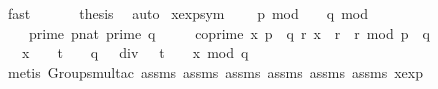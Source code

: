 \begin{isabellebody}
\ fast\ \isanewline
\ \ \isamarkupfalse%
\ \isamarkupfalse%
\ {\isachardoublequoteopen}{\isacharquery}{\kern0pt}thesis{\isachardoublequoteclose}\ \isamarkupfalse%
\ auto\isanewline
{}\isamarkupfalse%
%
\endisatagproof
{\isafoldproof}%
%
\isadelimproof
\isanewline
%
\endisadelimproof
\isanewline
\isanewline
{}\isamarkupfalse%
\ x{\isacharunderscore}{\kern0pt}exp{\isacharunderscore}{\kern0pt}sym{\isacharcolon}{\kern0pt}\ \isanewline
\ \ \ {\isachardoublequoteopen}p\ mod\ {}\ {\isacharequal}{\kern0pt}\ {}{\isachardoublequoteclose}\ {\isachardoublequoteopen}q\ mod\ {}\ {\isacharequal}{\kern0pt}\ {}{\isachardoublequoteclose}\ \isanewline
\ \ \ \ {\isachardoublequoteopen}prime\ {\isacharparenleft}{\kern0pt}p{\isacharcolon}{\kern0pt}{\isacharcolon}{\kern0pt}nat{\isacharparenright}{\kern0pt}{\isachardoublequoteclose}\ {\isachardoublequoteopen}prime\ q{\isachardoublequoteclose}\ \isanewline
\ \ \ \ {\isachardoublequoteopen}coprime\ x\ {\isacharparenleft}{\kern0pt}p\ {\isacharasterisk}{\kern0pt}\ q{\isacharparenright}{\kern0pt}{\isachardoublequoteclose}\ {\isachardoublequoteopen}{\isasymexists}r{\isachardot}{\kern0pt}\ {\isacharbrackleft}{\kern0pt}x\ {\isacharequal}{\kern0pt}\ r\ {\isacharasterisk}{\kern0pt}\ r{\isacharbrackright}{\kern0pt}\ {\isacharparenleft}{\kern0pt}mod\ p\ {\isacharasterisk}{\kern0pt}\ q{\isacharparenright}{\kern0pt}{\isachardoublequoteclose}\isanewline
\ \ \ {\isachardoublequoteopen}{\isacharbrackleft}{\kern0pt}{\isacharparenleft}{\kern0pt}x\ {\isacharcircum}{\kern0pt}\ {\isacharparenleft}{\kern0pt}{}\ {\isacharcircum}{\kern0pt}\ {\isacharparenleft}{\kern0pt}t\ {\isacharplus}{\kern0pt}\ {}{\isacharparenright}{\kern0pt}{\isacharparenright}{\kern0pt}{\isacharparenright}{\kern0pt}\ {\isacharcircum}{\kern0pt}\ {\isacharparenleft}{\kern0pt}{\isacharparenleft}{\kern0pt}{\isacharparenleft}{\kern0pt}q\ {\isacharplus}{\kern0pt}\ {}{\isacharparenright}{\kern0pt}\ div\ {}{\isacharparenright}{\kern0pt}\ {\isacharcircum}{\kern0pt}\ {\isacharparenleft}{\kern0pt}t\ {\isacharplus}{\kern0pt}\ {}{\isacharparenright}{\kern0pt}{\isacharparenright}{\kern0pt}\ {\isacharequal}{\kern0pt}\ x{\isacharbrackright}{\kern0pt}\ {\isacharparenleft}{\kern0pt}mod\ q{\isacharparenright}{\kern0pt}{\isachardoublequoteclose}\isanewline
%
\isadelimproof
\ \ %
\endisadelimproof
%
\isatagproof
{}\isamarkupfalse%
\ {\isacharparenleft}{\kern0pt}metis\ Groups{\isachardot}{\kern0pt}mult{\isacharunderscore}{\kern0pt}ac{\isacharparenleft}{\kern0pt}{}{\isacharparenright}{\kern0pt}\ assms{\isacharparenleft}{\kern0pt}{}{\isacharparenright}{\kern0pt}\ assms{\isacharparenleft}{\kern0pt}{}{\isacharparenright}{\kern0pt}\ assms{\isacharparenleft}{\kern0pt}{}{\isacharparenright}{\kern0pt}\ assms{\isacharparenleft}{\kern0pt}{}{\isacharparenright}{\kern0pt}\ assms{\isacharparenleft}{\kern0pt}{}{\isacharparenright}{\kern0pt}\ assms{\isacharparenleft}{\kern0pt}{}{\isacharparenright}{\kern0pt}\ x{\isacharunderscore}{\kern0pt}exp{\isacharparenright}{\kern0pt}%

\end{isabellebody}
